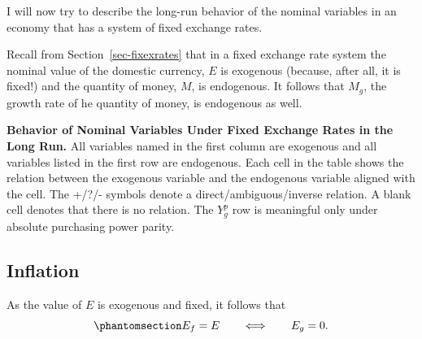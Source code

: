 \documentclass[
  letterpaper,
]{book}
\theoremstyle{plain}
\theoremstyle{remark}
\begin{document}
I will now try to describe the long-run behavior of the nominal
variables in an economy that has a system of fixed exchange rates.

Recall from Section~\ref{sec-fixexrates} that in a fixed exchange rate
system the nominal value of the domestic currency, \(E\) is exogenous
(because, after all, it is fixed!) and the quantity of money, \(M\), is
endogenous. It follows that \(M_g\), the growth rate of he quantity of
money, is endogenous as well.

\begin{table}

\caption{\label{tbl-nominal_long_fix}\textbf{Behavior of Nominal
Variables Under Fixed Exchange Rates in the Long Run.} All variables
named in the first column are exogenous and all variables listed in the
first row are endogenous. Each cell in the table shows the relation
between the exogenous variable and the endogenous variable aligned with
the cell. The +/?/- symbols denote a direct/ambiguous/inverse relation.
A blank cell denotes that there is no relation. The \(Y^p_g\) row is
meaningful only under absolute purchasing power parity.}


\end{table}%

\subsection{Inflation}\label{sec-pifix}

As the value of \(E\) is exogenous and fixed, it follows that
\begin{equation}\phantomsection\label{eq-egfix}{
E_f=E\qquad\Longleftrightarrow\qquad E_g=0.
}\end{equation}
\end{document}
